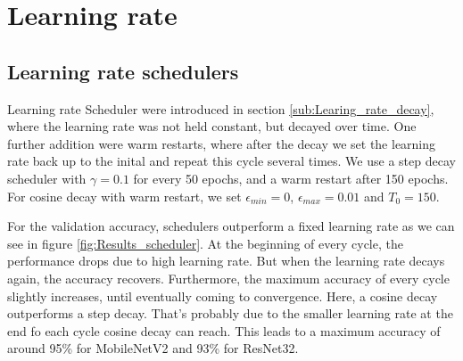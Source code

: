 \section{Learning rate}\label{res:Learning_rate}
\subsection{Learning rate schedulers}\label{res:Scheduler}
Learning rate Scheduler were introduced in section \ref{sub:Learing_rate_decay},
where the learning rate was not held constant, but decayed over time. One
further addition were warm restarts, where after the decay we set the learning
rate back up to the inital and repeat this cycle several times. We use a step
decay scheduler with $\gamma = 0.1$ for every 50 epochs, and a warm restart
after 150 epochs. For cosine decay with warm restart, we set $\epsilon_{min}=0$,
$\epsilon_{max}=0.01$ and $T_0=150$.


For the validation accuracy, schedulers outperform a fixed learning rate as we
can see in figure \ref{fig:Results_scheduler}. At the beginning of every cycle,
the performance drops due to high learning rate. But when the learning rate
decays again, the accuracy recovers. Furthermore, the maximum accuracy of every
cycle slightly increases, until eventually coming to convergence. Here, a cosine
decay outperforms a step decay. That's probably due to the smaller learning rate
at the end fo each cycle cosine decay can reach. This leads to a maximum
accuracy of around 95\% for MobileNetV2 and 93\% for ResNet32.


